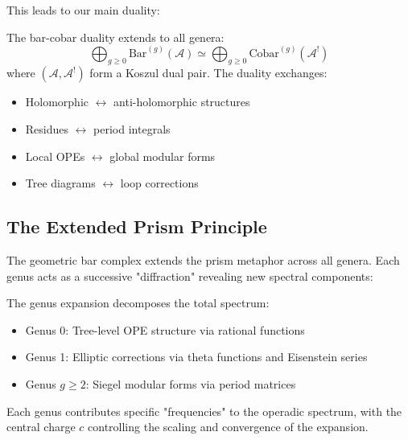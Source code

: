 This leads to our main duality:

\begin{theorem}[Main]
The bar-cobar duality extends to all genera:
$$\bigoplus_{g \geq 0} \text{Bar}^{(g)}(\mathcal{A}) \simeq \bigoplus_{g \geq 0} \text{Cobar}^{(g)}(\mathcal{A}^!)$$
where $(\mathcal{A}, \mathcal{A}^!)$ form a Koszul dual pair. The duality exchanges:
\begin{itemize}
\item Holomorphic $\leftrightarrow$ anti-holomorphic structures
\item Residues $\leftrightarrow$ period integrals
\item Local OPEs $\leftrightarrow$ global modular forms
\item Tree diagrams $\leftrightarrow$ loop corrections
\end{itemize}
\end{theorem}

\subsection{The Extended Prism Principle}

The geometric bar complex extends the prism metaphor across all genera. Each genus acts as a 
successive "diffraction" revealing new spectral components:

\begin{center}
\end{center}

The genus expansion decomposes the total spectrum:
\begin{itemize}
\item Genus 0: Tree-level OPE structure via rational functions
\item Genus 1: Elliptic corrections via theta functions and Eisenstein series
\item Genus $g \geq 2$: Siegel modular forms via period matrices
\end{itemize}

Each genus contributes specific "frequencies" to the operadic spectrum, with the central charge 
$c$ controlling the scaling and convergence of the expansion.

